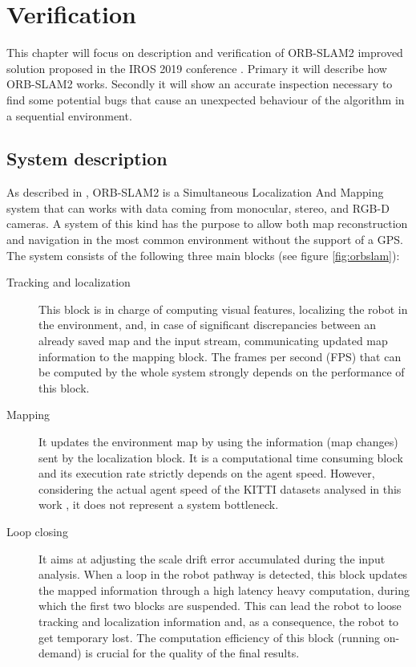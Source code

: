 \chapter{Verification} \label{chap:verification}
This chapter will focus on description and verification of ORB-SLAM2 \cite{murORB2} improved solution proposed in the IROS 2019 conference \cite{iros2019}. Primary it will describe how ORB-SLAM2 works. Secondly it will show an accurate inspection necessary to find some potential bugs that cause an unexpected behaviour of the algorithm in a sequential environment.

 \section{System description}
 As described in \cite{iros2019}, ORB-SLAM2 is a Simultaneous Localization And Mapping system that can works with data coming from monocular, stereo, and RGB-D cameras. A system of this kind has the purpose to allow both map reconstruction and navigation in the most common environment without the support of a GPS.
 The system consists of the following three main blocks (see figure \ref{fig:orbslam}):

\begin{description}
	\item[Tracking and localization] 
	This block is in charge of computing visual features, localizing the robot in the environment, and, in case of significant discrepancies between an already saved map and the input stream, communicating updated map information to the mapping block. The frames per second (FPS) that can be computed by the whole system strongly depends on the performance of this block.
	\item[Mapping] 
	It updates the environment map by using the information (map changes) sent by the localization block. It is a computational time consuming block and its execution rate strictly depends on the agent speed. However, considering the actual agent speed of the KITTI datasets analysed in this work \cite{CVPR2012}, it does not represent a system bottleneck.
	\item[Loop closing] 
	It aims at adjusting the scale drift error accumulated during the input analysis. When a loop in the robot pathway is detected, this block updates the mapped information through a high latency heavy computation, during which the first two blocks are suspended. This can lead the robot to loose tracking and localization information and, as a consequence, the robot to get temporary lost. The computation efficiency of this block (running on-demand) is crucial for the quality of the final results.
\end{description}

